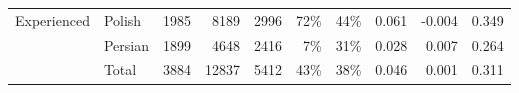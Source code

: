 \begin{table*}[t]
\begin{tabular}{llrrrr|rrrr}
\cline{1-10}
\multirow{3}{*}{Experienced} & Polish &                  1985 &                       8189 &                  2996 &                    72\% &                                                44\% &                 0.061 &                          -0.004 &       0.349 \\
            & Persian &                  1899 &                       4648 &                  2416 &                     7\% &                                                31\% &                 0.028 &                           0.007 &       0.264 \\
            & Total &                  3884 &                      12837 &                  5412 &                    43\% &                                                38\% &                 0.046 &                           0.001 &       0.311 \\
\bottomrule

\end{tabular}
\label{table:participants}
\end{table*}
